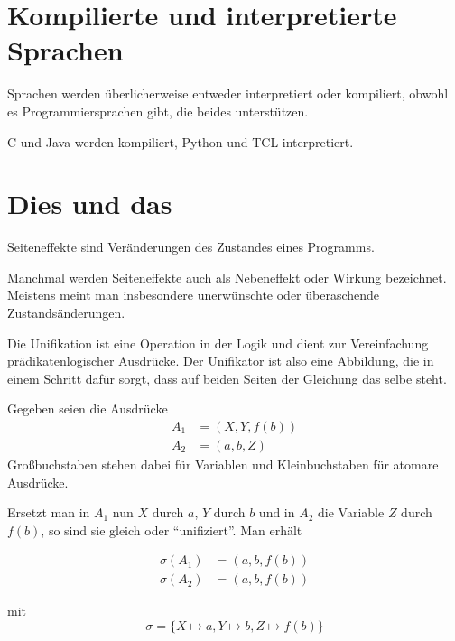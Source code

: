\section{Kompilierte und interpretierte Sprachen}
Sprachen werden überlicherweise entweder interpretiert oder kompiliert,
obwohl es Programmiersprachen gibt, die beides unterstützen.

C und Java werden kompiliert, Python und TCL interpretiert.

\section{Dies und das}
\begin{definition}[Seiteneffekt]%
    Seiteneffekte sind Veränderungen des Zustandes eines Programms.
\end{definition}

Manchmal werden Seiteneffekte auch als Nebeneffekt oder Wirkung bezeichnet.
Meistens meint man insbesondere unerwünschte oder überaschende Zustandsänderungen.

\begin{definition}[Unifikation]%
    Die Unifikation ist eine Operation in der Logik und dient zur Vereinfachung
    prädikatenlogischer Ausdrücke.
    Der Unifikator ist also eine Abbildung, die in einem Schritt dafür sorgt, dass
    auf beiden Seiten der Gleichung das selbe steht.
\end{definition}

\begin{beispiel}
    Gegeben seien die Ausdrücke
    \begin{align*}
        A_1 &= \left(X, Y, f(b) \right)\\
        A_2 &= \left(a, b, Z \right)
    \end{align*}
    Großbuchstaben stehen dabei für Variablen und Kleinbuchstaben für atomare 
    Ausdrücke.

    Ersetzt man in $A_1$ nun $X$ durch $a$, $Y$ durch $b$ und in $A_2$ 
    die Variable $Z$ durch $f\left(b\right)$, so sind sie gleich oder 
    \enquote{unifiziert}. Man erhält

    \begin{align*}
        \sigma(A_1) &= \left(a, b, f(b) \right)\\
        \sigma(A_2) &= \left(a, b, f(b) \right)
    \end{align*}

    mit
    \[\sigma = \{X \mapsto a, Y \mapsto b, Z \mapsto f(b)\}\]
\end{beispiel}


